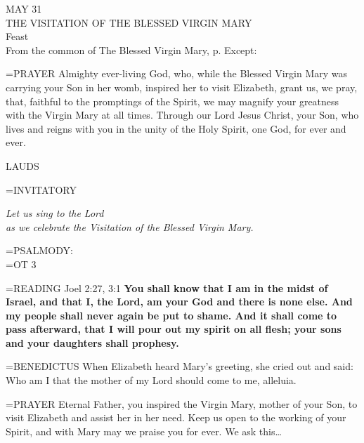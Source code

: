 \begin{center}\normalsize MAY 31\\
\footnotesize THE VISITATION OF THE BLESSED VIRGIN MARY\\
\footnotesize Feast\\
\footnotesize From the common of The Blessed Virgin Mary, p.     Except:\\
\end{center}

\hangindent=\parindent \small{PRAYER 
Almighty ever-living God,
who, while the Blessed Virgin Mary was carrying your Son in her womb,
inspired her to visit Elizabeth,
grant us, we pray,
that, faithful to the promptings of the Spirit,
we may magnify your greatness
with the Virgin Mary at all times.
Through our Lord Jesus Christ, your Son,
who lives and reigns with you in the unity of the Holy Spirit,
one God, for ever and ever.\\}
 
\begin{flushleft}\normalsize LAUDS\\\end{flushleft}

\hangindent=\parindent \small{INVITATORY}
\begin{center}
\textit{Let us sing to the Lord\\}
\textit{as we celebrate the Visitation of the Blessed Virgin Mary.\\}
\end{center}

\hangindent=\parindent \small{PSALMODY:}\\
\hangindent=\parindent  OT 3\vspace{0.5em}

\hangindent=\parindent \small{READING} Joel 2:27, 3:1 \textbf{You shall know that I am in the midst of Israel,
and that I, the Lord, am your God and there is none else. And my
people shall never again be put to shame. And it shall come to pass
afterward, that I will pour out my spirit on all flesh; your sons and
your daughters shall prophesy.\\}
 
\hangindent=\parindent \small{BENEDICTUS  When Elizabeth heard Mary’s greeting, she cried out
and said: Who am I that the mother of my Lord should come to me,
alleluia.\\}
 
\hangindent=\parindent \small{PRAYER 
Eternal Father, you inspired the Virgin Mary, mother of your
Son, to visit Elizabeth and assist her in her need. Keep us open to the
working of your Spirit, and with Mary may we praise you for ever.
We ask this…\\}
 
